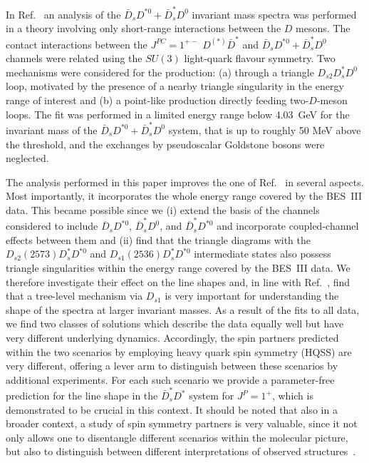 \documentclass[preprint,12pt,3p]{elsarticle}
\begin{document}
In Ref.~\cite{Yang:2020nrt} an analysis of the $\bar{D}_s D^{*0} +
\bar{D}_s^* D^0$ invariant mass spectra was performed in a theory
involving only short-range interactions between the $D$ mesons. The
contact interactions between the $J^{PC}=1^{+-}$ $D^{(*)} \bar D^*$
and $\bar{D}_s D^{*0} + \bar{D}_s^* D^0$ channels were related using
the $SU(3)$ light-quark flavour symmetry. Two mechanisms were
considered for the production: (a) through a triangle $D_{s2} D_s^* D^0$ loop, motivated by the presence of a nearby triangle singularity in the energy range of interest and (b) a point-like production directly feeding two-$D$-meson loops.
The fit was performed in a limited energy range below 4.03~GeV for the
invariant mass of the $\bar{D}_s D^{*0} + \bar{D}_s^* D^0$ system,
that is up to roughly 50 MeV above the threshold, and the exchanges by pseudoscalar Goldstone bosons were neglected. 

The analysis performed in this paper improves the one of
Ref.~\cite{Yang:2020nrt} in several aspects. Most importantly, it
incorporates the whole energy range covered by the BES~III data. This became
possible since we (i) extend the basis of the channels considered to include $\bar{D}_s D^{*0}$, $\bar{D}_s^* D^0$, and $\bar{D}_s^* D^{*0}$ and incorporate coupled-channel effects between them and (ii) find that the triangle diagrams with the $D_{s2}(2573) D_s^* D^{*0}$ and $D_{s1}(2536) D_s^* D^{*0}$ intermediate states also possess triangle singularities within the energy range covered by the BES~III data. We therefore investigate their effect on the line shapes and, in line with Ref.~\cite{BESIII:2020qkh}, find that a tree-level mechanism via $D_{s1} $ is very important for understanding the shape of the spectra at larger invariant masses. 
As a result of the fits to all data, we find two classes of solutions which describe the data equally well but have very different underlying dynamics. Accordingly, the spin partners predicted within the two scenarios by employing heavy quark spin symmetry (HQSS)
are very different, offering a lever arm to distinguish between these scenarios by additional
experiments. For each such scenario we provide a parameter-free prediction for the line shape in the $\bar{D}_s^* D^{*} $ system for $J^{P}=1^+$, which 
is demonstrated to be crucial in this context. It should be noted that also in a broader context, a study of spin symmetry
partners is very valuable, since it not only allows one to disentangle different scenarios within the molecular picture,
but also to distinguish between different interpretations of observed structures~\cite{Cleven:2015era}.
\end{document}
